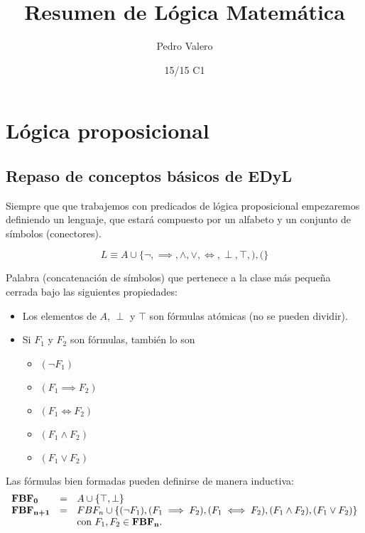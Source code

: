 \documentclass{apuntes}
\title{Resumen de Lógica Matemática}
\author{Pedro Valero}
\date{15/15 C1}
\begin{document}
\pagestyle{plain}
\maketitle

\tableofcontents

\chapter{Lógica proposicional}

\section{Repaso de conceptos básicos de EDyL}
Siempre que que trabajemos con predicados de lógica proposicional empezaremos definiendo un lenguaje, que estará compuesto por un alfabeto y un conjunto de símbolos (conectores). 

\[L \equiv A\cup\{\neg,\implies, \wedge, \vee, \iff, \perp, \top, ), ( \}\]

\begin{defn}
	Palabra (concatenación de símbolos) que pertenece a la clase más pequeña cerrada bajo las siguientes propiedades:
	\begin{itemize}
		\item Los elementos de $A$, $\perp$ y $\top$ son fórmulas atómicas (no se pueden dividir).
		\item Si $F_1$ y $F_2$ son fórmulas, también lo son
		\begin{itemize}
			\item $(\neg F_1)$
			\item $(F_1\implies F_2)$
			\item $(F_1\iff F_2)$
			\item $(F_1\wedge F_2)$
			\item $(F_1\vee F_2)$
		\end{itemize}
	\end{itemize}
\end{defn}

Las fórmulas bien formadas pueden definirse de manera inductiva:
\begin{equation*}
\begin{array}{l l l}
	\textbf{FBF}_\textbf{0} &=& A\cup\{\top, \perp \}\\
	\textbf{FBF}_\textbf{n+1} &=& FBF_n \cup \{(\neg F_1), (F_1\implies F_2),(F_1\iff F_2),(F_1\wedge F_2),(F_1\vee F_2)\}\\ &&\text{con } F_1,F_2\in \textbf{FBF}_\textbf{n}.
\end{array}
\end{equation*}
\end{document}
